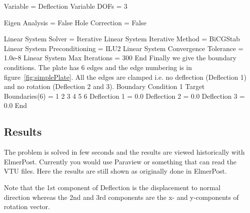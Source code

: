   Variable = Deflection
  Variable DOFs = 3

  Eigen Analysis = False
  Hole Correction = False

  Linear System Solver = Iterative
  Linear System Iterative Method = BiCGStab
  Linear System Preconditioning = ILU2
  Linear System Convergence Tolerance = 1.0e-8
  Linear System Max Iterations = 300
End
\ttend
Finally we give the boundary conditions. The plate has 6 edges and
the edge numbering is in figure~\ref{fig:simplePlate}. All the edges are
clamped i.e. no deflection (Deflection 1) and  no rotation (Deflection 2 and 3).
\ttbegin
Boundary Condition 1
  Target Boundaries(6) = 1 2 3 4 5 6
  Deflection 1 = 0.0
  Deflection 2 = 0.0
  Deflection 3 = 0.0
End
\ttend

\subsection*{Results}

The problem is solved in few seconds and the results are viewed historically with ElmerPost. Currently you would use Paraview or something that can read the
VTU files. Here the results are still shown as originally done in ElmerPost.

Note that the 1st component of Deflection is the displacement to normal
direction whereas the 2nd and 3rd components are the x- and y-components of
rotation vector.

